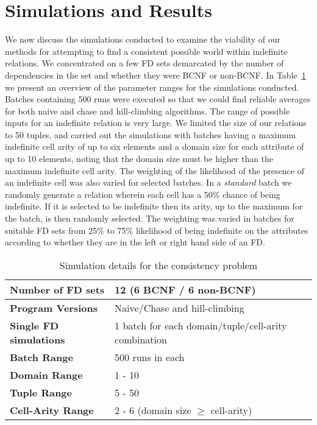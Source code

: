 \section{Simulations and Results}\label{sec:cpresults}
	

We now discuss the simulations conducted to examine the 
viability of our methods for attempting to find a
consistent possible world within indefinite relations.
We concentrated on a few FD sets demarcated by the number of
dependencies in the set and whether they were BCNF or non-BCNF.  
In Table~\ref{table:simpar} we present an overview of the parameter
ranges for the simulations
conducted. Batches containing 500 runs were executed so that we 
could find reliable averages for both naive and chase and
hill-climbing algorithms. The range of possible inputs for an indefinite
relation is very large. We limited the size of our relations to 50 tuples,
and carried out the simulations with batches having a maximum indefinite
cell arity of up to six elements and a domain size for each attribute of
up to 10 elements, noting that the domain size must be higher than the
maximum indefinite cell arity.  The weighting of the likelihood of the
presence of an indefinite cell was also varied for selected batches.
In a {\em standard} batch we randomly generate a relation wherein each
cell has a 50\% chance of being indefinite. If it is selected to be
indefinite then its arity, up to the maximum for the batch, is then
randomly selected. The weighting was varied in batches for suitable
FD sets from 25\% to 75\% likelihood of being indefinite on the
attributes according to whether they are in the left or right hand side
of an FD.

{\line
\begin{table}[ht]
\begin{center}
\begin{tabular}{|l||l|}
\hline
{\bf Number of FD sets}  & 12 (6 BCNF / 6 non-BCNF) \\ \hline
{\bf Program Versions} & Naive/Chase and hill-climbing \\ \hline
{\bf Single FD simulations} & 1 batch for each domain/tuple/cell-arity combination\\ \hline
{\bf Batch Range} & 500 runs in each \\ \hline
{\bf Domain Range} & 1 - 10  \\ \hline
{\bf Tuple Range} & 5 - 50  \\ \hline 
{\bf Cell-Arity Range} & 2 - 6 (domain size $\ge$ cell-arity) \\ \hline 
\end{tabular}
\end{center}
\caption{\label{table:simpar} Simulation details for the consistency problem}
\end{table}
}



